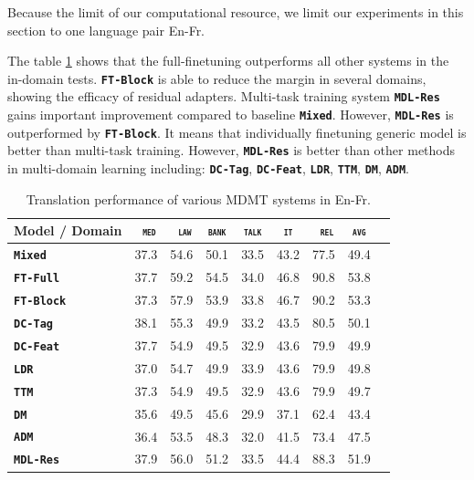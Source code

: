 \documentclass[11pt,a4paper]{article}
\newcommand{\fyDone}[1]{\done[FY]\Todo[FY:]{\textcolor{orange}{#1}}}
\newcommand{\domain}[1]{\texttt{\textsc{#1}}}
\newcommand{\system}[1]{\texttt{\textbf{#1}}}
\begin{document}
Because the limit of our computational resource, we limit our experiments in this section to one language pair En-Fr. 

The table \ref{tab:performance-multi} shows that the full-finetuning outperforms all other systems in the in-domain tests. \system{FT-Block} is able to reduce the margin in several domains, showing the efficacy of residual adapters. Multi-task training system \system{MDL-Res} gains important improvement compared to baseline \system{Mixed}. However, \system{MDL-Res} is outperformed by \system{FT-Block}. It means that individually finetuning generic model is better than multi-task training. However, \system{MDL-Res} is better than other methods in multi-domain learning including:  \system{DC-Tag},  \system{DC-Feat}, \system{LDR}, \system{TTM}, \system{DM}, \system{ADM}.

\begin{table}[htbp]
  \centering
  \fyDone{Fix column size}
  \begin{tabular}{|p{3cm}|*{8}{r|}} \hline
    Model / Domain & \multicolumn{1}{c|}{\domain{ med}} & \multicolumn{1}{c|}{\domain{ law}} & \multicolumn{1}{c|}{\domain{bank}} & \multicolumn{1}{c|}{\domain{talk}} & \multicolumn{1}{c|}{\domain{ it }} & \multicolumn{1}{c|}{\domain{ rel}} & \multicolumn{1}{c|}{\domain{avg}} \\ \hline 
    \system{Mixed}  & 37.3 & 54.6 & 50.1 & 33.5 & 43.2 & 77.5  &  49.4 \\
    \system{FT-Full}       & 37.7 & 59.2 & 54.5 & 34.0 & 46.8 & 90.8 & 53.8 \\
   \system{FT-Block}     & 37.3 & 57.9 & 53.9 & 33.8 & 46.7 & 90.2 & 53.3 \\ 
   \hline 
    \system{DC-Tag}       & 38.1 & 55.3 & 49.9   & 33.2 & 43.5 & 80.5  & 50.1 \\
    \system{DC-Feat}      & 37.7  & 54.9 & 49.5   & 32.9 & 43.6 & 79.9 & 49.9 \\
    \system{LDR}            & 37.0   & 54.7 & 49.9 & 33.9 & 43.6 & 79.9 & 49.8 \\
    \system{TTM}            & 37.3 & 54.9 & 49.5 & 32.9 & 43.6 & 79.9 & 49.7  \\
    \system{DM}             & 35.6 & 49.5  & 45.6 & 29.9 & 37.1 & 62.4 & 43.4 \\ 
    \system{ADM}           & 36.4 & 53.5  & 48.3 & 32.0 & 41.5 & 73.4 & 47.5\\
    \system{MDL-Res}     & 37.9 & 56.0 & 51.2  & 33.5 & 44.4 & 88.3 & 51.9 \\
     \hline
  \end{tabular}
  \caption{Translation performance of various MDMT systems in En-Fr. }
  \label{tab:performance-multi}
\end{table}
\end{document}
